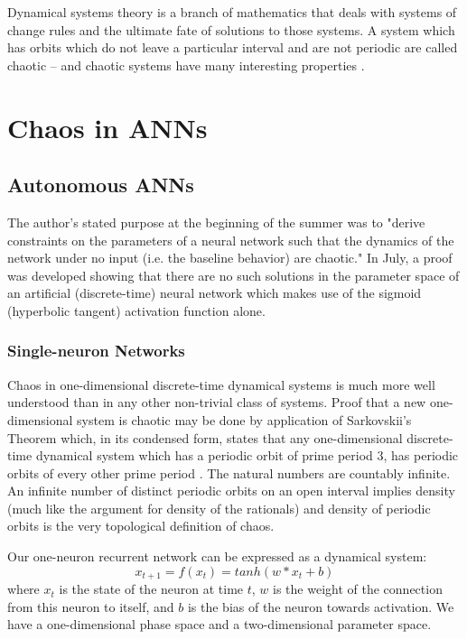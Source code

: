\documentclass[12pt]{article}
\begin{document}
Dynamical systems theory is a branch of mathematics that deals with systems 
of change rules and the ultimate fate of solutions to those systems.  A system
which has orbits which do not leave a particular interval and are not periodic
are called chaotic -- and chaotic systems have many interesting properties 
\cite{alligood, arrowsmith, devaney, hirsch}.


\section{Chaos in ANNs}
\subsection{Autonomous ANNs}
The author's stated purpose at the beginning of the summer was to "derive 
constraints on the
parameters of a neural network such that the dynamics of the network under
no input (i.e. the baseline behavior) are chaotic."  In July,
a proof was developed showing that there are no such
solutions in the parameter space of an artificial (discrete-time) neural
network which makes use of the sigmoid (hyperbolic tangent) activation function
alone.

\subsubsection{Single-neuron Networks}

Chaos in one-dimensional discrete-time dynamical systems is much more well
understood than in any other non-trivial class of systems.  Proof that
a new one-dimensional system is chaotic may be done by application of
Sarkovskii's Theorem
which, in its condensed form, states that any one-dimensional discrete-time 
dynamical system which has a periodic orbit of prime period $3$, has 
periodic orbits of every other prime period \cite{devaney}.  The natural numbers are 
countably infinite.  An infinite number of distinct periodic orbits on an 
open interval implies density (much like the argument for density of the 
rationals) and density of periodic orbits is the very topological definition 
of chaos.

Our one-neuron recurrent network can be expressed as a dynamical system:
$$x_{t+1} = f(x_{t}) = tanh(w*x_{t} + b)$$
where $x_{t}$ is the state of the neuron at time $t$, $w$ is the weight of the 
connection from this neuron to itself, and $b$ is the bias of the neuron 
towards activation.  We have a one-dimensional phase space and a 
two-dimensional parameter space.
\end{document}
